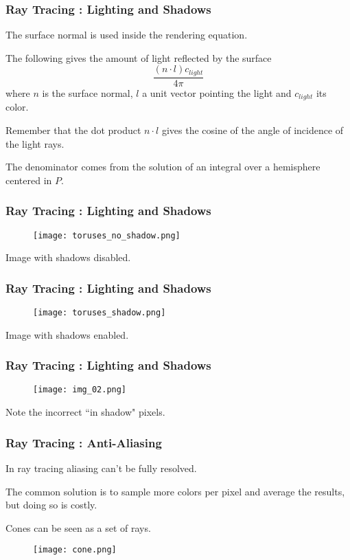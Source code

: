\documentclass{beamer}
\begin{document}
\begin{frame}
\frametitle{Ray Tracing : Lighting and Shadows}
The surface normal is used inside the rendering equation.

The following gives the amount of light reflected by the surface
$$
\dfrac{ (n \cdot l) c_{light} }
{ 4 \pi }
$$
where $n$ is the surface normal, $l$ a unit vector pointing the light and $c_{light}$ its color.

Remember that the dot product $n \cdot l$ gives the cosine of the angle of incidence of the light rays.

The denominator comes from the solution of an integral over a hemisphere centered in $P$.
\end{frame}



\begin{frame}
\frametitle{Ray Tracing : Lighting and Shadows}
\begin{figure}[!htb]
  \centering
  \texttt{[image: toruses\_no\_shadow.png]}
\end{figure}
Image with shadows disabled.
\end{frame}

\begin{frame}
\frametitle{Ray Tracing : Lighting and Shadows}
\begin{figure}[!htb]
  \centering
  \texttt{[image: toruses\_shadow.png]}
\end{figure}
Image with shadows enabled.
\end{frame}

\begin{frame}
\frametitle{Ray Tracing : Lighting and Shadows}
\begin{figure}[!htb]
  \centering
  \texttt{[image: img\_02.png]}
\end{figure}
Note the incorrect ``in shadow" pixels.
\end{frame}

\begin{frame}
\frametitle{Ray Tracing : Anti-Aliasing}
In ray tracing aliasing can't be fully resolved.

The common solution is to sample more colors per pixel and average the results, but doing so is costly.

Cones can be seen as a set of rays.

\begin{figure}[!htb]
  \centering
  \texttt{[image: cone.png]}
\end{figure}
\end{frame}
\end{document}
